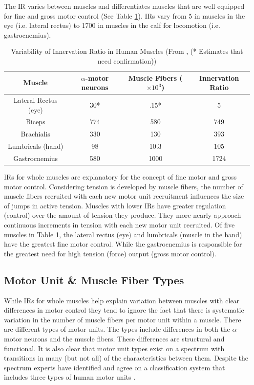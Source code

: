 The IR varies between muscles and differentiates muscles that are well equipped for fine and gross motor control (See Table \ref{table:Innervation_Ratios}). IRs vary from 5 in muscles in the eye (i.e. lateral rectus) to 1700 in muscles in the calf for locomotion (i.e. gastrocnemius).

\begin{table}[h!]
\centering
\begin{tabular}{||c c c c||} 
 \hline
 Muscle & $\alpha$-motor neurons & Muscle Fibers ($\times 10^3$) & Innervation Ratio \\ [0.5ex] 
 \hline\hline
 Lateral Rectus (eye) & 30* &.15* & 5 \\
 Biceps  & 774 & 580 & 749 \\ 
 Brachialis & 330 & 130 & 393 \\
 Lumbricals (hand) &  98 & 10.3 & 105 \\ 
 Gastrocnemius & 580 & 1000 & 1724 \\[1ex] 
 \hline
\end{tabular}
\caption{Variability of Innervation Ratio in Human Muscles (\footnotesize{From \cite{buchthal_motor_1980}, (* Estimates that need confirmation)})}
\label{table:Innervation_Ratios}
\end{table}

IRs for whole muscles are explanatory for the concept of fine motor and gross motor control. Considering tension is developed by muscle fibers, the number of muscle fibers recruited with each new motor unit recruitment influences the size of jumps in active tension. Muscles with lower IRs have greater regulation (control) over the amount of tension they produce. They more nearly approach continuous increments in tension with each new motor unit recruited. Of five muscles in Table \ref{table:Innervation_Ratios}, the lateral rectus (eye) and lumbricals (muscle in the hand) have the greatest fine motor control. While the gastrocnemius is responsible for the greatest need for high tension (force) output (gross motor control).

\subsection{Motor Unit \& Muscle Fiber Types}

While IRs for whole muscles help explain variation between muscles with clear differences in motor control they tend to ignore the fact that there is systematic variation in the number of muscle fibers per motor unit within a muscle. There are different types of motor units. The types include differences in both the $\alpha$-motor neurons and the muscle fibers. These differences are structural and functional. It is also clear that motor unit types exist on a spectrum with transitions in many (but not all) of the characteristics between them. Despite the spectrum experts have identified and agree on a classification system that includes three types of human motor units \cite{lieber_skeletal_2010}.

